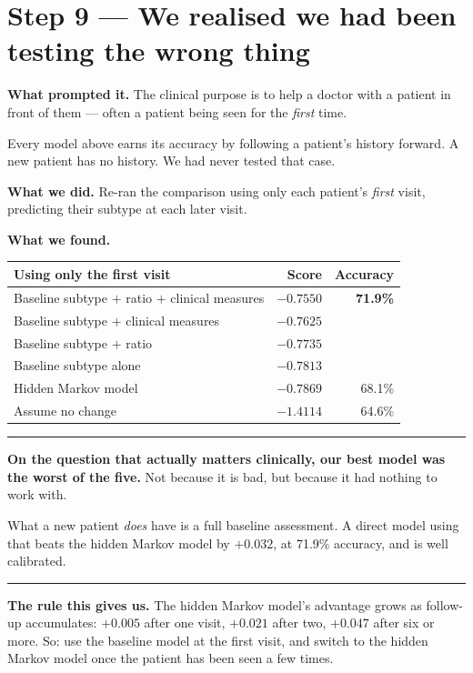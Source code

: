 \documentclass[11pt,a4paper]{article}
\newenvironment{found}
  {\begin{center}\begin{minipage}{0.95\textwidth}%
   \vspace{4pt}\hrule\vspace{6pt}\small}
  {\vspace{6pt}\hrule\vspace{4pt}\end{minipage}\end{center}}
\begin{document}
\section{Step 9 --- We realised we had been testing the wrong thing}

\textbf{What prompted it.} The clinical purpose is to help a doctor with a
patient in front of them --- often a patient being seen for the \emph{first}
time.

Every model above earns its accuracy by following a patient's history forward. A
new patient has no history. We had never tested that case.

\textbf{What we did.} Re-ran the comparison using only each patient's
\emph{first} visit, predicting their subtype at each later visit.

\textbf{What we found.}

\begin{table}[H]
\centering
\begin{tabular}{@{}lrr@{}}
\toprule
\textbf{Using only the first visit} & \textbf{Score} & \textbf{Accuracy} \\
\midrule
Baseline subtype $+$ ratio $+$ clinical measures & $\mathbf{-0.7550}$ & \textbf{71.9\%} \\
Baseline subtype $+$ clinical measures & $-0.7625$ & \\
Baseline subtype $+$ ratio & $-0.7735$ & \\
Baseline subtype alone & $-0.7813$ & \\
Hidden Markov model & $-0.7869$ & 68.1\% \\
Assume no change & $-1.4114$ & 64.6\% \\
\bottomrule
\end{tabular}
\end{table}

\begin{found}
\textbf{On the question that actually matters clinically, our best model was the
worst of the five.} Not because it is bad, but because it had nothing to work
with.

What a new patient \emph{does} have is a full baseline assessment. A direct
model using that beats the hidden Markov model by $+0.032$, at 71.9\% accuracy,
and is well calibrated.
\end{found}

\textbf{The rule this gives us.} The hidden Markov model's advantage grows as
follow-up accumulates: $+0.005$ after one visit, $+0.021$ after two, $+0.047$
after six or more. So: use the baseline model at the first visit, and switch to
the hidden Markov model once the patient has been seen a few times.
\end{document}
